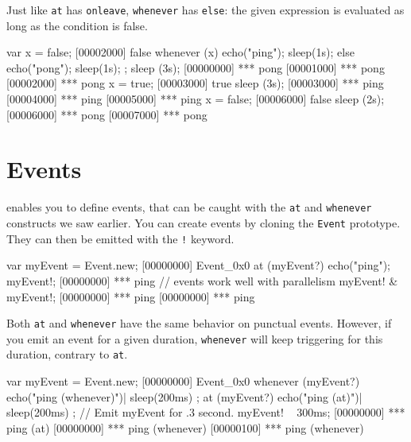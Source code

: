 Just like \lstinline|at| has \lstinline|onleave|, \lstinline|whenever|
has \lstinline|else|: the given expression is evaluated as long as the
condition is false.

\begin{urbiscript}
var x = false;
[00002000] false
whenever (x)
{
  echo("ping");
  sleep(1s);
}
else
{
  echo("pong");
  sleep(1s);
};
sleep (3s);
[00000000] *** pong
[00001000] *** pong
[00002000] *** pong
x = true;
[00003000] true
sleep (3s);
[00003000] *** ping
[00004000] *** ping
[00005000] *** ping
x = false;
[00006000] false
sleep (2s);
[00006000] *** pong
[00007000] *** pong
\end{urbiscript}

\section{Events}
\label{sec:tut:events}
\us enables you to define events, that can be caught with the
\lstinline|at| and \lstinline|whenever| constructs we saw earlier. You
can create events by cloning the \lstinline|Event| prototype. They can
then be emitted with the \lstinline|!| keyword.

\begin{urbiscript}
var myEvent = Event.new;
[00000000] Event_0x0
at (myEvent?)
  echo("ping");
myEvent!;
[00000000] *** ping
// events work well with parallelism
myEvent! & myEvent!;
[00000000] *** ping
[00000000] *** ping
\end{urbiscript}

Both \lstinline|at| and \lstinline|whenever| have the same behavior on
punctual events. However, if you emit an event for a given duration,
\lstinline|whenever| will keep triggering for this duration, contrary
to \lstinline|at|.

\begin{urbiscript}
var myEvent = Event.new;
[00000000] Event_0x0
whenever (myEvent?)
{
  echo("ping (whenever)")|
  sleep(200ms)
};
at (myEvent?)
{
  echo("ping (at)")|
  sleep(200ms)
};
// Emit myEvent for .3 second.
myEvent! ~ 300ms;
[00000000] *** ping (at)
[00000000] *** ping (whenever)
[00000100] *** ping (whenever)
\end{urbiscript}


